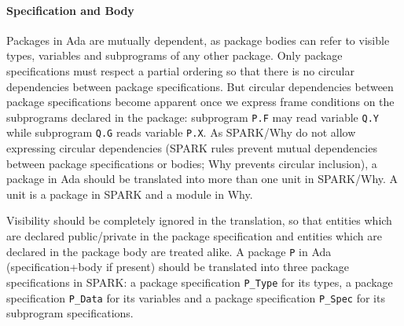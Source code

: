 \documentclass{article}
\begin{document}
\paragraph{Specification and Body}

Packages in Ada are mutually dependent, as package bodies can refer to visible
types, variables and subprograms of any other package. Only package
specifications must respect a partial ordering so that there is no circular
dependencies between package specifications. But circular dependencies between
package specifications become apparent once we express frame conditions on the
subprograms declared in the package: subprogram \verb|P.F| may read variable
\verb|Q.Y| while subprogram \verb|Q.G| reads variable \verb|P.X|.  As SPARK/Why
do not allow expressing circular dependencies (SPARK rules prevent mutual
dependencies between package specifications or bodies; Why prevents circular
inclusion), a package in Ada should be translated into more than one unit in
SPARK/Why. A unit is a package in SPARK and a module in Why.

Visibility should be completely ignored in the translation, so that entities
which are declared public/private in the package specification and entities
which are declared in the package body are treated alike. A package \verb|P| in
Ada (specification+body if present) should be translated into three package
specifications in SPARK: a package specification \verb|P_Type| for its types, a
package specification \verb|P_Data| for its variables and a package
specification \verb|P_Spec| for its subprogram specifications.
\end{document}
